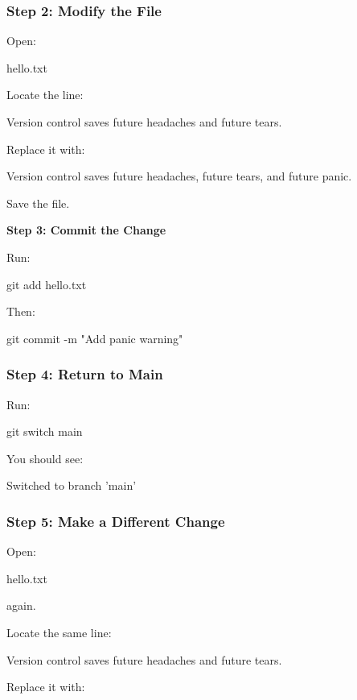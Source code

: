 \documentclass{csc2059practical}
\begin{document}
\subsubsection{Step 2: Modify the File}
Open:

\begin{terminalplain}
hello.txt
\end{terminalplain}
Locate the line:

\begin{terminalplain}
Version control saves future headaches and future tears.
\end{terminalplain}
Replace it with:

\begin{terminalplain}
Version control saves future headaches, future tears, and future panic.
\end{terminalplain}
Save the file.

\textbf{Step 3: Commit the Change}

Run:

\begin{terminalplain}
git add hello.txt
\end{terminalplain}
Then:

\begin{terminalplain}
git commit -m "Add panic warning"
\end{terminalplain}
\subsubsection{Step 4: Return to Main}
Run:

\begin{terminalplain}
git switch main
\end{terminalplain}
You should see:

\begin{terminalplain}
Switched to branch 'main'
\end{terminalplain}
\subsubsection{Step 5: Make a Different Change}
Open:

\begin{terminalplain}
hello.txt
\end{terminalplain}
again.

Locate the same line:

\begin{terminalplain}
Version control saves future headaches and future tears.
\end{terminalplain}
Replace it with:
\end{document}
